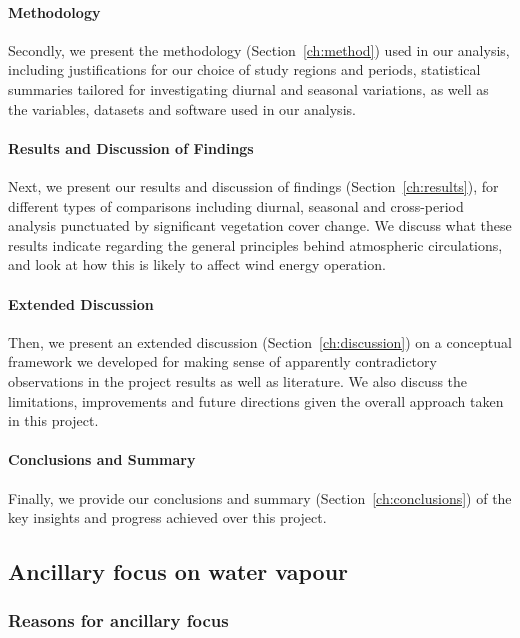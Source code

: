 \paragraph{Methodology}

Secondly, we present the methodology (Section~\ref{ch:method}) used in our analysis, including justifications for our choice of study regions and periods, statistical summaries tailored for investigating diurnal and seasonal variations, as well as the variables, datasets and software used in our analysis.

\paragraph{Results and Discussion of Findings}

Next, we present our results and discussion of findings (Section~\ref{ch:results}), for different types of comparisons including diurnal, seasonal and cross-period analysis punctuated by significant vegetation cover change. We discuss what these results indicate regarding the general principles behind atmospheric circulations, and look at how this is likely to affect wind energy operation.

\paragraph{Extended Discussion}

Then, we present an extended discussion (Section~\ref{ch:discussion}) on a conceptual framework we developed for making sense of apparently contradictory observations in the project results as well as literature. We also discuss the limitations, improvements and future directions given the overall approach taken in this project.

\paragraph{Conclusions and Summary}

Finally, we provide our conclusions and summary (Section~\ref{ch:conclusions}) of the key insights and progress achieved over this project.

\subsection{Ancillary focus on water vapour}

\subsubsection{Reasons for ancillary focus}

